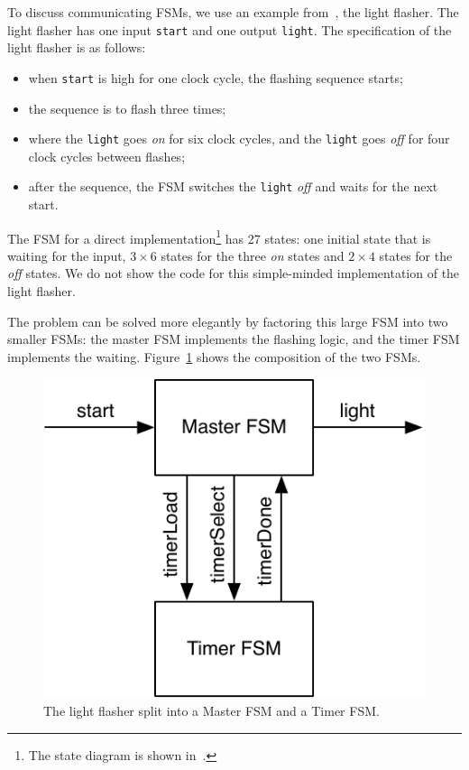 \documentclass[%
    10pt,
    headinclude, footexclude,
    openright, %
    notitlepage,
    cleardoubleempty,
    headsepline,
    pointlessnumbers,
    bibtotoc, idxtotoc,
    ]{scrbook}
\newcommand{\code}[1]{{\small{\texttt{#1}}}}
\newcommand{\scale}{0.7}
\begin{document}
To discuss communicating FSMs, we use an example
from~\cite[Chapter~17]{dally:vhdl:2016}, the light flasher.
The light flasher has one input \code{start} and one output
\code{light}. The specification of the light flasher is as follows:
\begin{itemize}
\item when \code{start} is high for one clock cycle, the flashing
sequence starts;
\item the sequence is to flash three times;
\item where the \code{light} goes \emph{on} for six clock cycles, and the \code{light} goes \emph{off} for four clock cycles between flashes;
\item after the sequence, the FSM switches the \code{light} \emph{off} and waits
for the next start.
\end{itemize}

The FSM for a direct implementation\footnote{The state diagram is shown
in~\cite[p.~376]{dally:vhdl:2016}.} has 27 states:
one initial state that is waiting for the input, $3 \times 6$ states for the three
\emph{on} states and $2 \times 4$ states for the \emph{off} states.
We do not show the code for this simple-minded implementation of the light
flasher.

The problem can be solved more elegantly by factoring this large FSM into
two smaller FSMs: the master FSM implements the flashing logic, and the timer FSM
implements the waiting. Figure~\ref{fig:flasher} shows the composition of
the two FSMs.

\begin{figure}
  \centering
  \includegraphics[scale=\scale]{figures/flasher}
  \caption{The light flasher split into a Master FSM and a Timer FSM.}
  \label{fig:flasher}
\end{figure}
\end{document}

